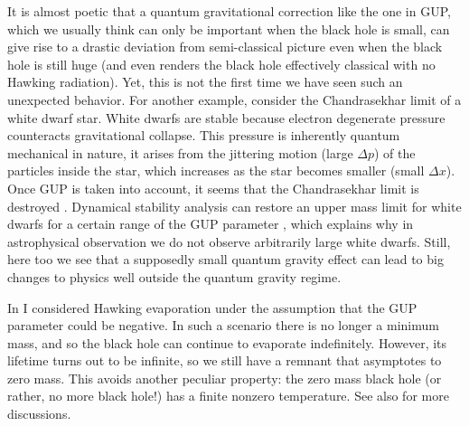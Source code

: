 \documentclass[preprintnumbers, floatfix, preprintnumbers, letterpaper, twocolumn, superscriptaddress,nofootinbib]{revtex4-2}
\begin{document}
It is almost poetic that a quantum gravitational correction like the one in GUP, which we usually think can only be important when the black hole is small, can give rise to a drastic deviation from semi-classical picture even when the black hole is still huge (and even renders the black hole effectively classical with no Hawking radiation). Yet, this is not the first time we have seen such an unexpected behavior. For another example, consider the Chandrasekhar limit of a white dwarf star. White dwarfs are stable because electron degenerate pressure counteracts gravitational collapse. This pressure is inherently quantum mechanical in nature, it arises from the jittering motion (large $\Delta p$) of the particles inside the star, which increases as the star becomes smaller (small $\Delta x$). Once GUP is taken into account, it seems that the Chandrasekhar limit is destroyed \cite{1512.06356,1804.05176}. Dynamical stability analysis can restore an upper mass limit for white dwarfs for a certain range of the GUP parameter \cite{2002.08360}, which explains why in astrophysical observation we do not observe arbitrarily large white dwarfs. Still, here too we see that a supposedly small quantum gravity effect can lead to big changes to physics well outside the quantum gravity regime.

In \cite{1806.03691} I considered Hawking evaporation under the assumption that the GUP parameter could be negative. In such a scenario there is no longer a minimum mass, and so the black hole can continue to evaporate indefinitely. However, its lifetime turns out to be infinite, so we still have a remnant that asymptotes to zero mass. This avoids another peculiar property: the zero mass black hole (or rather, no more black hole!) has a finite nonzero temperature. See also \cite{1812.03136} for more discussions.
\end{document}
